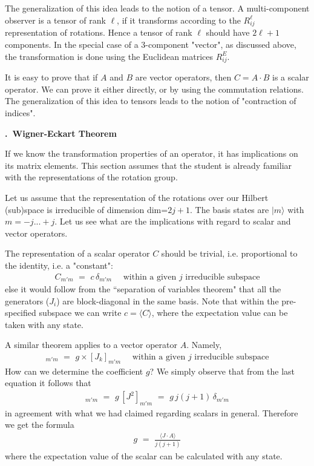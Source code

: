 \documentclass[onecolumn,fleqn, 11pt]{revtex4}
\newcommand{\beq}{\begin{eqnarray}}
\newcommand{\eeq}{\end{eqnarray}}
\renewcommand{\thesubsection}{\arabic{subsection}}
\renewcommand{\thesubsubsection}{\arabic{subsubsection}}
\newcommand{\sheadC}[1]
{
\addtocounter{subsubsection}{1}
\vspace{5mm}
{\bf \thesubsection.\thesubsubsection \ #1}  
\nopagebreak
\phantomsection
}
\begin{document}
The generalization of this idea leads to the 
notion of a tensor. A multi-component observer 
is a tensor of rank $\ell$, if it transforms 
according to the $R^{\ell}_{ij}$ representation  
of rotations. Hence a tensor of rank $\ell$ should
have $2\ell+1$ components.
In the special case of a 3-component "vector", 
as discussed above, the transformation is done using 
the Euclidean matrices $R^E_{ij}$. 

It is easy to prove that if $A$ and $B$ are 
vector operators, then $C=A\cdot B$ is a 
scalar operator. We can prove it either directly, 
or by using the commutation relations.   
The generalization of this idea to tensors 
leads to the notion of "contraction of indices". 


\sheadC{Wigner-Eckart Theorem}

If we know the transformation properties of an operator, 
it has implications on its matrix elements.
This section assumes that the student is already familiar 
with the representations of the rotation group.

Let us assume that the representation of the rotations 
over our Hilbert (sub)space is irreducible of dimension dim=$2j{+}1$.
The basis states are ${|m\rangle}$ with ${m=-j...+j}$. 
Let us see what are the implications 
with regard to scalar and vector operators.  

The representation of a scalar operator $C$ should be trivial, 
i.e. proportional to the identity, i.e. a "constant":   
\beq
C_{m'm} \,\,=\,\, c \, \delta_{m'm}  
\ \ \ \ \ \ \mbox{within a given $j$ irreducible subspace} 
\eeq
else it would follow from the ``separation of variables theorem" 
that all the generators ($J_i$) are block-diagonal in the same basis. 
Note that within the pre-specified subspace 
we can write $c = \langle C \rangle$, 
where the expectation value can be taken with any state.

A similar theorem applies to a vector operator $A$. Namely,  
\beq
[A_k]_{m'm} \,\,=\,\, g \times [J_k]_{m'm}  
\ \ \ \ \ \ \mbox{within a given $j$ irreducible subspace} 
\eeq
How can we determine the coefficient $g$? 
We simply observe that from the last equation 
it follows that 
\beq
[A \cdot J]_{m'm} 
\,\,=\,\, g \, [J^2]_{m'm} 
\,\,=\,\,   g \, j(j+1) \, \delta_{m'm}
\eeq
in agreement with what we had claimed regarding 
scalars in general. Therefore we get the formula 
\beq
g \,\,=\,\, \frac {\langle J \cdot A\rangle}{j(j+1)} 
\eeq
where the expectation value of the scalar 
can be calculated with any state. 
\end{document}

